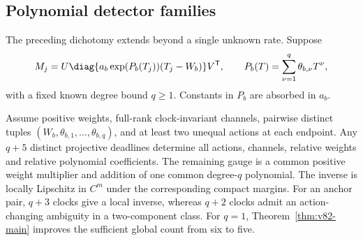 \subsection{Polynomial detector families}

The preceding dichotomy extends beyond a single unknown rate. Suppose
\begin{equation}\label{eq:v82-polynomial}
 M_j=U\diag\{a_b\exp(P_b(T_j))(T_j-W_b)\}V^{\mathsf T},\qquad
 P_b(T)=\sum_{\nu=1}^q\theta_{b,\nu}T^\nu,
\end{equation}
with a fixed known degree bound $q\ge1$. Constants in $P_b$ are absorbed
in $a_b$.

\begin{theorem}\label{thm:v82-polynomial}
Assume positive weights, full-rank clock-invariant channels, pairwise
distinct tuples $(W_b,\theta_{b,1},\ldots,\theta_{b,q})$, and at least
two unequal actions at each endpoint. Any $q+5$ distinct projective
deadlines determine all actions, channels, relative weights and relative
polynomial coefficients. The remaining gauge is a common positive
weight multiplier and addition of one common degree-$q$ polynomial.
The inverse is locally Lipschitz in $C^m$ under the corresponding compact
margins. For an anchor pair, $q+3$ clocks give a local inverse, whereas
$q+2$ clocks admit an action-changing ambiguity in a two-component class.
For $q=1$, Theorem~\ref{thm:v82-main} improves the sufficient global
count from six to five.
\end{theorem}
